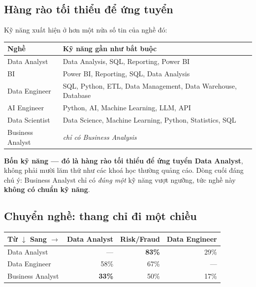 \documentclass[10pt]{article}
\newcommand{\keyfind}[1]{\textbf{#1}}
\begin{document}
\subsection{Hàng rào tối thiểu để ứng tuyển}

Kỹ năng xuất hiện ở hơn một nửa số tin của nghề đó:

\begin{center}
\small
\begin{tabular}{ll}
\toprule
\textbf{Nghề} & \textbf{Kỹ năng gần như bắt buộc} \\
\midrule
Data Analyst      & Data Analysis, SQL, Reporting, Power BI \\
BI                & Power BI, Reporting, SQL, Data Analysis \\
Data Engineer     & SQL, Python, ETL, Data Management, Data Warehouse, Database \\
AI Engineer       & Python, AI, Machine Learning, LLM, API \\
Data Scientist    & Data Science, Machine Learning, Python, Statistics, SQL \\
Business Analyst  & \textit{chỉ có Business Analysis} \\
\bottomrule
\end{tabular}
\end{center}

\keyfind{Bốn kỹ năng --- đó là hàng rào tối thiểu để ứng tuyển Data Analyst}, không phải mười lăm thứ như
các khoá học thường quảng cáo. Dòng cuối đáng chú ý: Business Analyst chỉ có \emph{đúng một} kỹ năng vượt
ngưỡng, tức nghề này \textbf{không có chuẩn kỹ năng}.

\subsection{Chuyển nghề: thang chỉ đi một chiều}

\begin{center}
\small
\begin{tabular}{lrrr}
\toprule
\textbf{Từ $\downarrow$ \quad Sang $\rightarrow$} & \textbf{Data Analyst} & \textbf{Risk/Fraud} & \textbf{Data Engineer} \\
\midrule
Data Analyst      & ---           & \textbf{83\%} & 29\% \\
Data Engineer     & 58\%          & 67\%          & ---  \\
Business Analyst  & \textbf{33\%} & 50\%          & 17\% \\
\bottomrule
\end{tabular}
\end{center}
\end{document}
